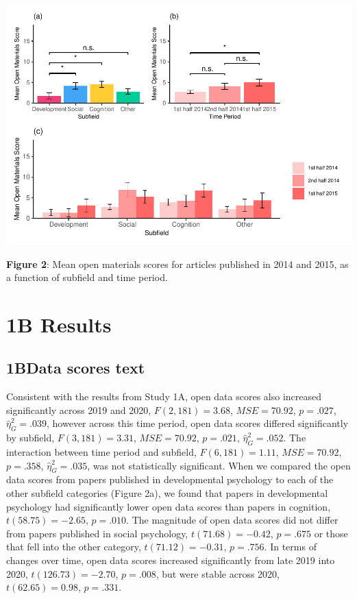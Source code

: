 \documentclass[
  english,
  man]{apa6}
\begin{document}
\includegraphics{icd_special_issue_files/figure-latex/1A-m-plots-1.pdf}

\textbf{Figure 2}: Mean open materials scores for articles published in 2014 and 2015, as a function of subfield and time period.

\hypertarget{b-results}{%
\section{1B Results}\label{b-results}}

\hypertarget{bdata-scores-text}{%
\subsection{1BData scores text}\label{bdata-scores-text}}

Consistent with the results from Study 1A, open data scores also increased significantly across 2019 and 2020, \(F(2, 181) = 3.68\), \(\mathit{MSE} = 70.92\), \(p = .027\), \(\hat{\eta}^2_G = .039\), however across this time period, open data scores differed significantly by subfield, \(F(3, 181) = 3.31\), \(\mathit{MSE} = 70.92\), \(p = .021\), \(\hat{\eta}^2_G = .052\). The interaction between time period and subfield, \(F(6, 181) = 1.11\), \(\mathit{MSE} = 70.92\), \(p = .358\), \(\hat{\eta}^2_G = .035\), was not statistically significant. When we compared the open data scores from papers published in developmental psychology to each of the other subfield categories (Figure 2a), we found that papers in developmental psychology had significantly lower open data scores than papers in cognition, \(t(58.75) = -2.65\), \(p = .010\). The magnitude of open data scores did not differ from papers published in social psychology, \(t(71.68) = -0.42\), \(p = .675\) or those that fell into the other category, \(t(71.12) = -0.31\), \(p = .756\). In terms of changes over time, open data scores increased significantly from late 2019 into 2020, \(t(126.73) = -2.70\), \(p = .008\), but were stable across 2020, \(t(62.65) = 0.98\), \(p = .331\).
\end{document}
